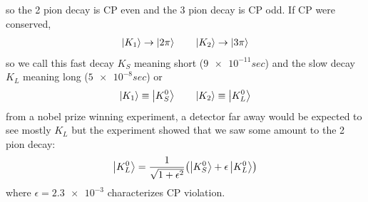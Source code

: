 \documentclass[../main.tex]{subfiles}
\begin{document}
so the 2 pion decay is CP even and the 3 pion decay is CP odd. If CP were conserved,
\begin{align*}
    \ket{K_1} \to \ket{2\pi} \qquad \ket{K_2} \to \ket{3\pi}
\end{align*}
so we call this fast decay $K_S$ meaning short ($\num{9e-11}{sec}$) and the slow decay $K_L$ meaning
long ($\num{5e-8}{sec}$) or
\begin{align*}
    \ket{K_1} \equiv \ket{K_S^0} \qquad \ket{K_2} \equiv \ket{K_L^0}
\end{align*}
from a nobel prize winning experiment, a detector far away would be expected to see mostly $K_L$ but
the experiment showed that we saw some amount to the 2 pion decay:
\begin{align*}
    \ket{K_L^0} = \frac{1}{\sqrt{1 + \epsilon^2}} \qt(\ket{K_S^0} + \epsilon \ket{K_L^0})
\end{align*}
where $\epsilon = \num{2.3e-3}$ characterizes CP violation.
\end{document}
